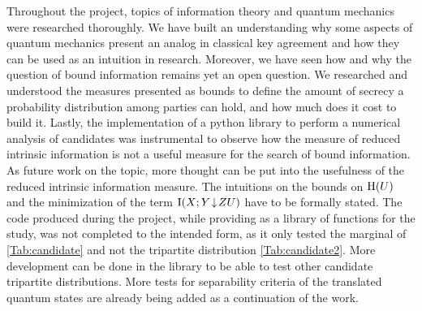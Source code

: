 Throughout the project, topics of information theory and quantum mechanics were researched thoroughly.
We have built an understanding why some aspects of quantum mechanics present an analog in classical key agreement and how they can be used as an intuition in research.
Moreover, we have seen how and why the question of bound information remains yet an open question.
We researched and understood the measures presented as bounds to define the amount of secrecy a probability distribution among parties can hold, and how much does it cost to build it.
Lastly, the implementation of a python library to perform a  numerical analysis of candidates was instrumental to observe how the measure of reduced intrinsic information is not a useful measure for the search of bound information.\\

As future work on the topic, more thought can be put into the usefulness of the reduced intrinsic information measure.
The intuitions on the bounds on $\operatorname{H}(U)$ and the minimization of the term $\operatorname{I}(X;Y\!\downarrow\!ZU)$ have to be formally stated.
The code produced during the project, while providing as a library of functions for the study, was not completed to the intended form, as it only tested the marginal of \ref{Tab:candidate} and not the tripartite distribution \ref{Tab:candidate2}.
More development can be done in the library to be able to test other candidate tripartite distributions.
More tests for separability criteria of the translated quantum states are already being added as a continuation of the work.